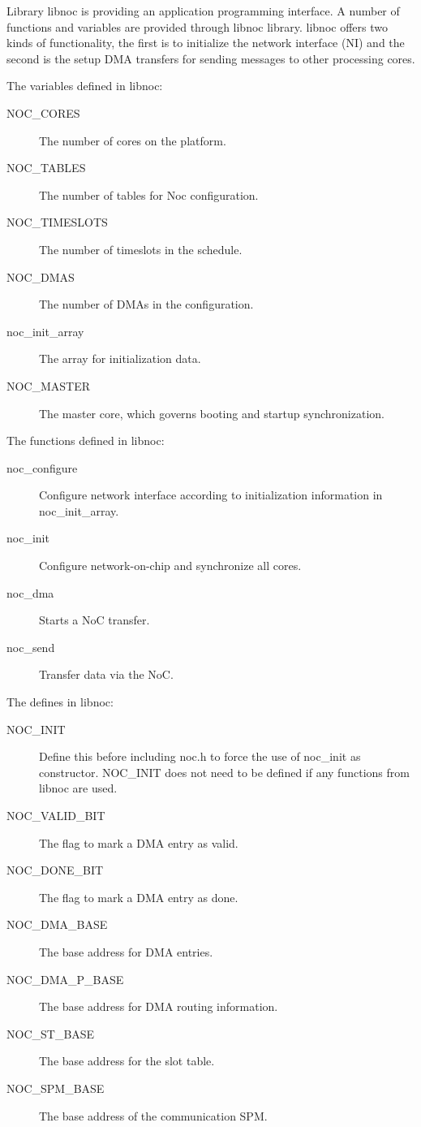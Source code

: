 \documentclass[a4paper,fontsize=10pt,twoside,DIV15,BCOR12mm,headinclude=true,footinclude=false,pagesize,bibtotoc]{scrbook}
\begin{document}
Library libnoc is providing an application programming interface. A number of functions and variables are provided through libnoc library. libnoc offers two kinds of functionality, the first is to initialize the network interface (NI) and the second is the setup DMA transfers for sending messages to other processing cores. 

The variables defined in libnoc:
\begin{description}
\item[NOC\_CORES] The number of cores on the platform. 
\item[NOC\_TABLES] The number of tables for Noc configuration. 
\item[NOC\_TIMESLOTS] The number of timeslots in the schedule. 
\item[NOC\_DMAS]	The number of DMAs in the configuration. 
\item[noc\_init\_array] The array for initialization data. 
\item[NOC\_MASTER] The master core, which governs booting and startup synchronization. 
\end{description}


The functions defined in libnoc:
\begin{description}
\item [noc\_configure] Configure network interface according to initialization information in noc\_init\_array.
\item [noc\_init] Configure network-on-chip and synchronize all cores. 
\item [noc\_dma] Starts a NoC transfer. 
\item [noc\_send] Transfer data via the NoC. 
\end{description}

The defines in libnoc:
\begin{description}
\item [NOC\_INIT] Define this before including noc.h to force the use of noc\_init as constructor. NOC\_INIT does not need to be defined if any functions from libnoc are used.
\item [NOC\_VALID\_BIT] The flag to mark a DMA entry as valid.
\item [NOC\_DONE\_BIT] The flag to mark a DMA entry as done.
\item [NOC\_DMA\_BASE] The base address for DMA entries.
\item [NOC\_DMA\_P\_BASE] The base address for DMA routing information.
\item [NOC\_ST\_BASE] The base address for the slot table.
\item [NOC\_SPM\_BASE] The base address of the communication SPM.
\end{description}
\end{document}
